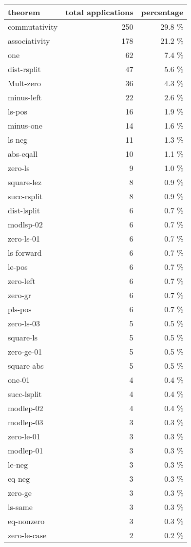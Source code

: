 \documentclass[a4paper]{article}
\begin{document}
\begin{supertabular}{l|r|r}
theorem	        & total applications & percentage \\ \hline
commutativity & 250 & 29.8 \% \\
associativity & 178 & 21.2 \% \\
one & 62 & 7.4 \% \\
dist-rsplit & 47 & 5.6 \% \\
Mult-zero & 36 & 4.3 \% \\
minus-left & 22 & 2.6 \% \\
ls-pos & 16 & 1.9 \% \\
minus-one & 14 & 1.6 \% \\
ls-neg & 11 & 1.3 \% \\
abs-eqall & 10 & 1.1 \% \\
zero-ls & 9 & 1.0 \% \\
square-lez & 8 & 0.9 \% \\
succ-rsplit & 8 & 0.9 \% \\
dist-lsplit & 6 & 0.7 \% \\
modlsp-02 & 6 & 0.7 \% \\
zero-ls-01 & 6 & 0.7 \% \\
ls-forward & 6 & 0.7 \% \\
le-pos & 6 & 0.7 \% \\
zero-left & 6 & 0.7 \% \\
zero-gr & 6 & 0.7 \% \\
pls-pos & 6 & 0.7 \% \\
zero-ls-03 & 5 & 0.5 \% \\
square-ls & 5 & 0.5 \% \\
zero-ge-01 & 5 & 0.5 \% \\
square-abs & 5 & 0.5 \% \\
one-01 & 4 & 0.4 \% \\
succ-lsplit & 4 & 0.4 \% \\
modlep-02 & 4 & 0.4 \% \\
modlep-03 & 3 & 0.3 \% \\
zero-le-01 & 3 & 0.3 \% \\
modlep-01 & 3 & 0.3 \% \\
le-neg & 3 & 0.3 \% \\
eq-neg & 3 & 0.3 \% \\
zero-ge & 3 & 0.3 \% \\
ls-same & 3 & 0.3 \% \\
eq-nonzero & 3 & 0.3 \% \\
zero-le-case & 2 & 0.2 \% \\

\end{supertabular}
\end{document}
